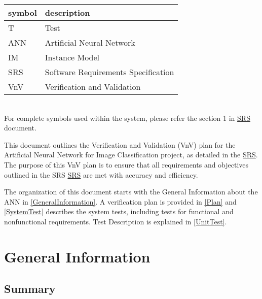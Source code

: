 \documentclass[12pt, titlepage]{article}
\begin{document}
\renewcommand{\arraystretch}{1.2}
\begin{tabular}{l l} 
  \toprule		
  \textbf{symbol} & \textbf{description}\\
  \midrule 
  T & Test\\
  ANN & Artificial Neural Network\\
  IM & Instance Model\\
  SRS & Software Requirements Specification\\
  VnV & Verification and Validation\\
  \bottomrule
\end{tabular}\\

For complete symbols used within the system, please refer the section 1 in 
\href{https://github.com/tanya-jp/ANN-CAS741/blob/main/docs/SRS/SRS.pdf}{SRS} document.



\newpage


This document outlines the Verification and Validation (VnV) plan for the Artificial 
Neural Network for Image Classification project, as detailed in the 
\href{https://github.com/tanya-jp/ANN-CAS741/blob/main/docs/SRS/SRS.pdf}{SRS}. 
The purpose of this VnV plan is to ensure that all requirements and objectives outlined 
in the SRS \href{https://github.com/tanya-jp/ANN-CAS741/blob/main/docs/SRS/SRS.pdf}{SRS} 
are met with accuracy and efficiency.

The organization of this document starts with the General Information about the ANN in \autoref{GeneralInformation}. 
A verification plan is provided in \autoref{Plan} and \autoref{SystemTest} 
describes the system tests, including tests for functional and nonfunctional requirements. 
Test Description is explained in \autoref{UnitTest}.

\section{General Information}\label{GeneralInformation}

\subsection{Summary}
\end{document}
